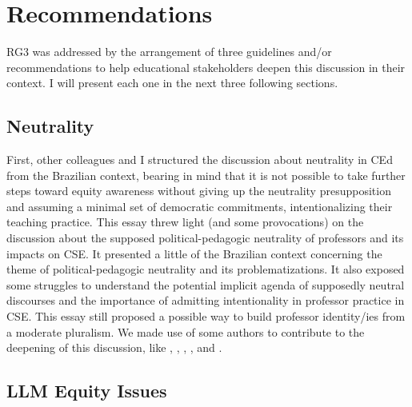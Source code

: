 \section{Recommendations}
\label{disc-sec:recommendations}

\gls{RG}3 was addressed by the arrangement of three guidelines and/or recommendations to help educational stakeholders deepen this discussion in their context. I will present each one in the next three following sections.

\subsection{Neutrality}
\label{disc-ss:neutrality}

First, other colleagues and I
structured the discussion about neutrality in \gls{CEd} \cite{bispojr:2022-educomp} from the Brazilian context, bearing in mind that it is not possible to take further steps toward equity awareness without giving up the neutrality presupposition and assuming a minimal set of democratic commitments, intentionalizing their teaching practice. This essay threw light (and some provocations) on the discussion about the supposed political-pedagogic neutrality of professors and its impacts on \gls{CSE}. It presented a little of the Brazilian context concerning the theme of political-pedagogic neutrality and its problematizations. It also exposed some struggles to understand the potential implicit agenda of supposedly neutral discourses and the importance of admitting intentionality in professor practice in \gls{CSE}. This essay still proposed a possible way to build professor identity/ies from a moderate pluralism. We made use of some authors to contribute to the deepening of this discussion, like , , , , and .

\subsection{LLM Equity Issues}
\label{disc-ss:llm-equity-issues}


